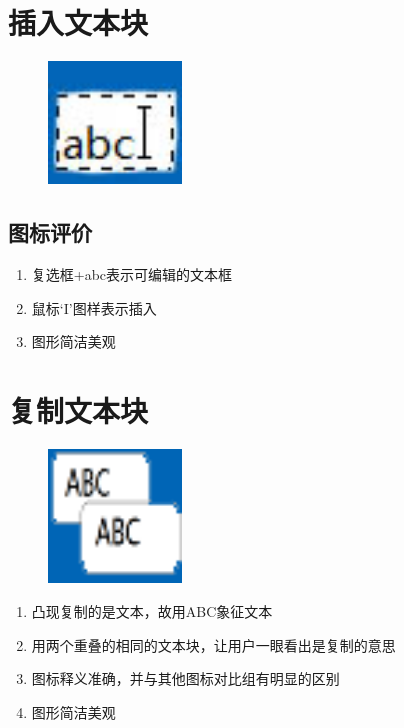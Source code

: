 ﻿\documentclass{beamer}
\begin{document}
\section{插入文本块}
\begin{frame}
  \begin{figure}[H]
  \includegraphics[width=1.4in]{img/2.jpg}
  \end{figure}
\end{frame}
\subsection{图标评价}
\begin{frame}
\begin{enumerate}
\item 复选框+abc表示可编辑的文本框
\item 鼠标‘I’图样表示插入
\item 图形简洁美观
\end{enumerate}
\end{frame}

\section{复制文本块}
\begin{frame}
  \begin{figure}[H]
  \includegraphics[width=1.4in]{img/3.bmp}
  \end{figure}
\end{frame}
\begin{frame}
\begin{enumerate}
\item 凸现复制的是文本，故用ABC象征文本
\item 用两个重叠的相同的文本块，让用户一眼看出是复制的意思
\item 图标释义准确，并与其他图标对比组有明显的区别
\item 图形简洁美观
\end{enumerate}
\end{frame}
\end{document}
